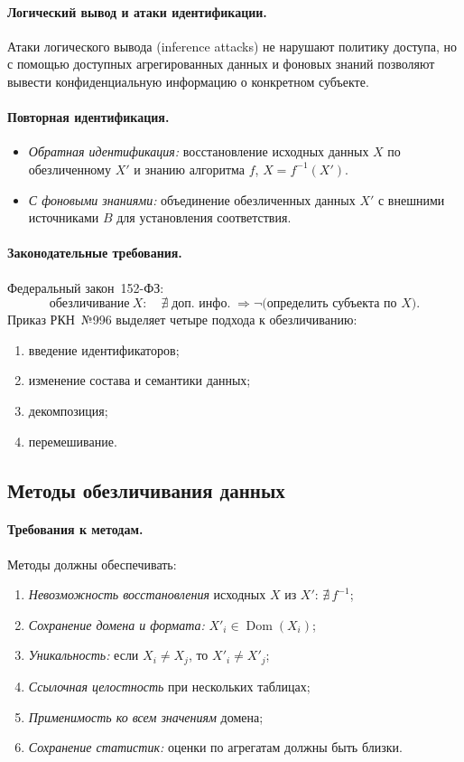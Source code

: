 \documentclass[areasetadvanced]{scrartcl}
\DeclareMathOperator{\Dom}{Dom}
\begin{document}
\paragraph{Логический вывод и атаки идентификации.}  
Атаки логического вывода (inference attacks) не нарушают политику доступа, но с помощью доступных агрегированных данных и фоновых знаний позволяют вывести конфиденциальную информацию о конкретном субъекте.

\paragraph{Повторная идентификация.}  
\begin{itemize}
  \item \emph{Обратная идентификация:} восстановление исходных данных $X$ по обезличенному $X'$ и знанию алгоритма $f$, $X = f^{-1}(X')$.
  \item \emph{С фоновыми знаниями:} объединение обезличенных данных $X'$ с внешними источниками $B$ для установления соответствия.
\end{itemize}

\paragraph{Законодательные требования.}  
Федеральный закон~152-ФЗ:
\[
  \text{обезличивание}~X:\quad
  \nexists\;\text{доп. инфо.}\;\Rightarrow
  \neg\bigl(\text{определить субъекта по }X\bigr).
\]
Приказ РКН~№996 выделяет четыре подхода к обезличиванию:
\begin{enumerate}
  \item введение идентификаторов;
  \item изменение состава и семантики данных;
  \item декомпозиция;
  \item перемешивание.
\end{enumerate}

\subsection{Методы обезличивания данных}

\paragraph{Требования к методам.}  
Методы должны обеспечивать:
\begin{enumerate}
  \item \emph{Невозможность восстановления} исходных $X$ из $X'$: $\nexists\,f^{-1}$;
  \item \emph{Сохранение домена и формата:} $X'_i\in\Dom(X_i)$;
  \item \emph{Уникальность:} если $X_i\neq X_j$, то $X'_i\neq X'_j$;
  \item \emph{Ссылочная целостность} при нескольких таблицах;
  \item \emph{Применимость ко всем значениям} домена;
  \item \emph{Сохранение статистик:} оценки по агрегатам должны быть близки.
\end{enumerate}
\end{document}
